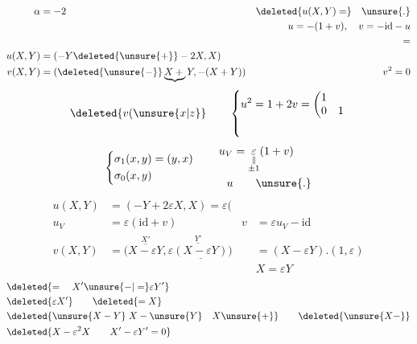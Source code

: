 \[
\begin{aligned}
\alpha&=-2 &\deleted{u(X,Y)=}\quad\unsure{.}\\
&&u=-(1+v),\quad v=-\mathrm{id}-u\\
&&\hspace{9em}=\\
u(X,Y)&=(-Y\deleted{\unsure{+}}-2X,X)\\
v(X,Y)&=(\deleted{\unsure{-}}\underbrace{X+{}}Y,-(X+Y)) & v^2=0
\end{aligned}
\]
\[
\deleted{v(\unsure{x|z}}\qquad
\left\{\begin{aligned} u^2&=1+2v=\left(\begin{matrix}1&\\0&1\end{matrix}\right.\\ &\phantom{1}\end{aligned}\right.
\]
\[
\left\{\begin{aligned}\sigma_1(x,y)&=(y,x)\\\sigma_0(x,y)&\end{aligned}\right.
\qquad\begin{aligned}
u_V&=\underset{\substack{\parallel\\\pm1}}{\varepsilon}(1+v)\\
u&\qquad\unsure{.}
\end{aligned}
\]
\[
\begin{aligned}
u(X,Y)&=(-Y+2\varepsilon X,X)=\varepsilon(\\
u_V&=\varepsilon(\mathrm{id}+v) &v&=\varepsilon u_V-\mathrm{id}\\
v(X,Y)&=\big(\overset{X'}{\overline{X-\varepsilon Y}},\overset{Y'}{\overline{\varepsilon\underline{(X-\varepsilon Y)}}}\big)
& &=(X-\varepsilon Y).(1,\varepsilon)\\
&&&X=\varepsilon Y
\end{aligned}
\]
\[
\begin{aligned}
&\deleted{=\quad X'\unsure{-|=}\varepsilon Y'}\\
&\deleted{\varepsilon X'}\qquad\deleted{=X}\\
&\deleted{\unsure{X-Y}\;X-\unsure{Y}\quad X\unsure{+}}\qquad\deleted{\unsure{X-}}\\
&\deleted{X-\varepsilon^2X\qquad X'-\varepsilon Y'=0}
\end{aligned}
\]
